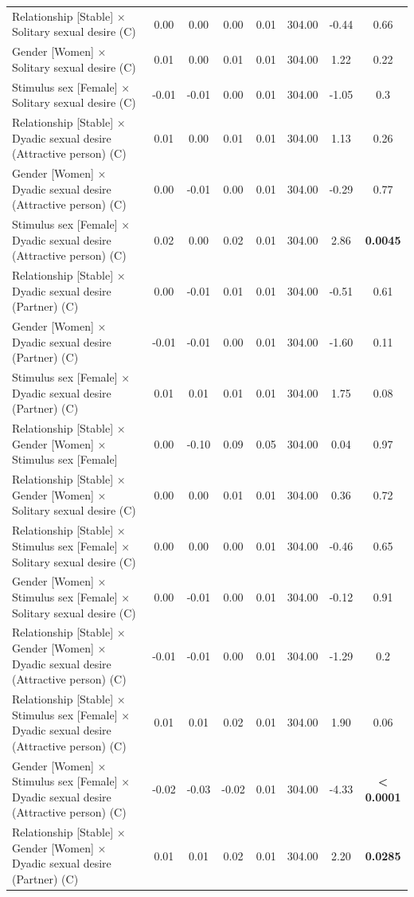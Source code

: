 \documentclass[
  bookmarksnumbered]{article}
\begin{document}
\begin{table}[H]
{\begin{threeparttable}
\begin{tabular}[t]{lccccccc}
Relationship [Stable] × Solitary sexual desire (C) & 0.00 & 0.00 & 0.00 & 0.01 & 304.00 & -0.44 & 0.66\\
Gender [Women] × Solitary sexual desire (C) & 0.01 & 0.00 & 0.01 & 0.01 & 304.00 & 1.22 & 0.22\\
Stimulus sex [Female] × Solitary sexual desire (C) & -0.01 & -0.01 & 0.00 & 0.01 & 304.00 & -1.05 & 0.3\\
Relationship [Stable] × Dyadic sexual desire (Attractive person) (C) & 0.01 & 0.00 & 0.01 & 0.01 & 304.00 & 1.13 & 0.26\\
Gender [Women] × Dyadic sexual desire (Attractive person) (C) & 0.00 & -0.01 & 0.00 & 0.01 & 304.00 & -0.29 & 0.77\\
Stimulus sex [Female] × Dyadic sexual desire (Attractive person) (C) & 0.02 & 0.00 & 0.02 & 0.01 & 304.00 & 2.86 & \textbf{0.0045}\\
Relationship [Stable] × Dyadic sexual desire (Partner) (C) & 0.00 & -0.01 & 0.01 & 0.01 & 304.00 & -0.51 & 0.61\\
Gender [Women] × Dyadic sexual desire (Partner) (C) & -0.01 & -0.01 & 0.00 & 0.01 & 304.00 & -1.60 & 0.11\\
Stimulus sex [Female] × Dyadic sexual desire (Partner) (C) & 0.01 & 0.01 & 0.01 & 0.01 & 304.00 & 1.75 & 0.08\\
Relationship [Stable] × Gender [Women] × Stimulus sex [Female] & 0.00 & -0.10 & 0.09 & 0.05 & 304.00 & 0.04 & 0.97\\
Relationship [Stable] × Gender [Women] × Solitary sexual desire (C) & 0.00 & 0.00 & 0.01 & 0.01 & 304.00 & 0.36 & 0.72\\
Relationship [Stable] × Stimulus sex [Female] × Solitary sexual desire (C) & 0.00 & 0.00 & 0.00 & 0.01 & 304.00 & -0.46 & 0.65\\
Gender [Women] × Stimulus sex [Female] × Solitary sexual desire (C) & 0.00 & -0.01 & 0.00 & 0.01 & 304.00 & -0.12 & 0.91\\
Relationship [Stable] × Gender [Women] × Dyadic sexual desire (Attractive person) (C) & -0.01 & -0.01 & 0.00 & 0.01 & 304.00 & -1.29 & 0.2\\
Relationship [Stable] × Stimulus sex [Female] × Dyadic sexual desire (Attractive person) (C) & 0.01 & 0.01 & 0.02 & 0.01 & 304.00 & 1.90 & 0.06\\
Gender [Women] × Stimulus sex [Female] × Dyadic sexual desire (Attractive person) (C) & -0.02 & -0.03 & -0.02 & 0.01 & 304.00 & -4.33 & \textbf{< 0.0001}\\
Relationship [Stable] × Gender [Women] × Dyadic sexual desire (Partner) (C) & 0.01 & 0.01 & 0.02 & 0.01 & 304.00 & 2.20 & \textbf{0.0285}\\

\end{tabular}
\end{threeparttable}}
\end{table}
\end{document}
